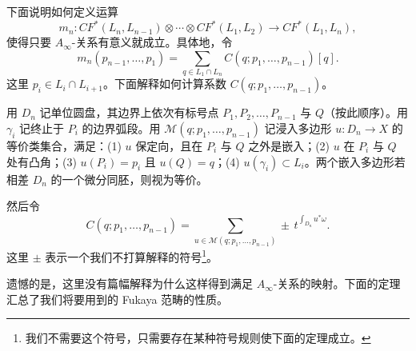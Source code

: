 
下面说明如何定义运算
\[
  m_n : CF^*(L_n,L_{n-1})\otimes\cdots\otimes CF^*(L_1,L_2) \longrightarrow CF^*(L_1,L_n),
\]
使得只要 $A_\infty$-关系有意义就成立。具体地，令
\[
  m_n(p_{n-1},\dots,p_1) = \sum_{q\in L_1\cap L_n} C(q;p_1,\dots,p_{n-1})[q].
\]
这里 $p_i\in L_i\cap L_{i+1}$。下面解释如何计算系数 $C(q;p_1,\dots,p_{n-1})$。


用 $D_n$ 记单位圆盘，其边界上依次有标号点 $P_1,P_2,\dots,P_{n-1}$ 与 $Q$（按此顺序）。用 $\gamma_i$ 记终止于 $P_i$ 的边界弧段。用 $\mathcal{M}(q;p_1,\dots,p_{n-1})$ 记浸入多边形 $u: D_n\to X$ 的等价类集合，满足：(1) $u$ 保定向，且在 $P_i$ 与 $Q$ 之外是嵌入；(2) $u$ 在 $P_i$ 与 $Q$ 处有凸角；(3) $u(P_i)=p_i$ 且 $u(Q)=q$；(4) $u(\gamma_i)\subset L_i$。两个嵌入多边形若相差 $D_n$ 的一个微分同胚，则视为等价。


然后令
\[
  C(q;p_1,\dots,p_{n-1}) = \sum_{u\in\mathcal{M}(q;p_1,\dots,p_{n-1})} \pm\, t^{\int_{D_n} u^*\omega}.
\]
这里 $\pm$ 表示一个我们不打算解释的符号\footnote{我们不需要这个符号，只需要存在某种符号规则使下面的定理成立。}。


遗憾的是，这里没有篇幅解释为什么这样得到满足 $A_\infty$-关系的映射。下面的定理汇总了我们将要用到的 Fukaya 范畴的性质。

